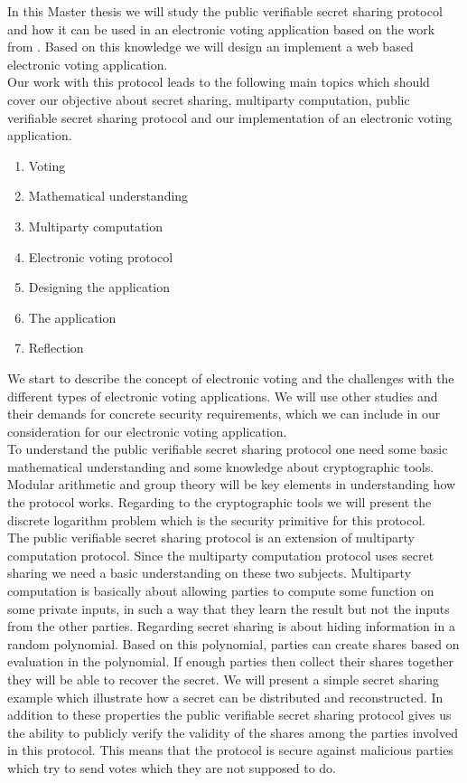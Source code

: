 In this Master thesis we will study the public verifiable secret sharing protocol and how it can be used in an electronic voting application based on the work from \cite{Schoenmakers1999}. Based on this knowledge we will design an implement a web based electronic voting application.\\

\noindent
Our work with this protocol leads to the following main topics which should cover our objective about secret sharing, multiparty computation, public verifiable secret sharing protocol and our implementation of an electronic voting application.

\begin{enumerate}
    \item Voting
    \item Mathematical understanding
    \item Multiparty computation
    \item Electronic voting protocol
    \item Designing the application
    \item The application
    \item Reflection
\end{enumerate}

\noindent
We start to describe the concept of electronic voting and the challenges with the different types of electronic voting applications. We will use other studies and their demands for concrete security requirements, which we can include in our consideration for our electronic voting application.  \\

\noindent
To understand the public verifiable secret sharing protocol one need some basic mathematical understanding and some knowledge about cryptographic tools. Modular arithmetic and group theory will be key elements in understanding how the protocol works. Regarding to the cryptographic tools we will present the discrete logarithm problem which is the security primitive for this protocol.\\

\noindent
The public verifiable secret sharing protocol is an extension of multiparty computation protocol. Since the multiparty computation protocol uses secret sharing we need a basic understanding on these two subjects. Multiparty computation is basically about allowing parties to compute some function on some private inputs, in such a way that they learn the result but not the inputs from the other parties. Regarding secret sharing is about hiding information in a random polynomial. Based on this polynomial, parties can create shares based on evaluation in the polynomial. If enough parties then collect their shares together they will be able to recover the secret.  We will present a simple secret sharing example which illustrate how a secret can be distributed and reconstructed. In addition to these properties the public verifiable secret sharing protocol gives us the ability to publicly verify the validity of the shares among the parties involved in this protocol. This means that the protocol is secure against malicious parties which try to send votes which they are not supposed to do. \\

